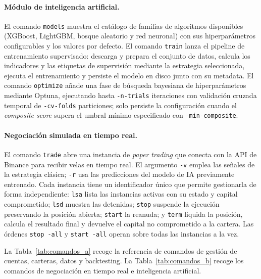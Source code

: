 \paragraph{Módulo de inteligencia artificial.}
El comando \texttt{models} muestra el catálogo de familias de algoritmos disponibles
(XGBoost, LightGBM, bosque aleatorio y red neuronal) con sus hiperparámetros
configurables y los valores por defecto. El comando \texttt{train} lanza el pipeline
de entrenamiento supervisado: descarga y prepara el conjunto de datos, calcula los
indicadores y las etiquetas de supervisión mediante la estrategia seleccionada,
ejecuta el entrenamiento y persiste el modelo en disco junto con su metadata. El
comando \texttt{optimize} añade una fase de búsqueda bayesiana de hiperparámetros
mediante Optuna, ejecutando hasta \texttt{-n-trials} iteraciones con validación
cruzada temporal de \texttt{-cv-folds} particiones; solo persiste la configuración
cuando el \textit{composite score} supera el umbral mínimo especificado con
\texttt{-min-composite}.

\paragraph{Negociación simulada en tiempo real.}
El comando \texttt{trade} abre una instancia de \textit{paper trading} que conecta
con la API de Binance para recibir velas en tiempo real. El argumento \texttt{-v}
emplea las señales de la estrategia clásica; \texttt{-r} usa las predicciones del
modelo de IA previamente entrenado. Cada instancia tiene un identificador único que
permite gestionarla de forma independiente: \texttt{lsa} lista las instancias activas
con su estado y capital comprometido; \texttt{lsd} muestra las detenidas; \texttt{stop}
suspende la ejecución preservando la posición abierta; \texttt{start} la reanuda; y
\texttt{term} liquida la posición, calcula el resultado final y devuelve el capital no
comprometido a la cartera. Las órdenes \texttt{stop -all} y \texttt{start -all}
operan sobre todas las instancias a la vez.

La Tabla~\ref{tab:comandos_a} recoge la referencia de comandos de gestión de cuentas,
carteras, datos y backtesting. La Tabla~\ref{tab:comandos_b} recoge los comandos de
negociación en tiempo real e inteligencia artificial.

